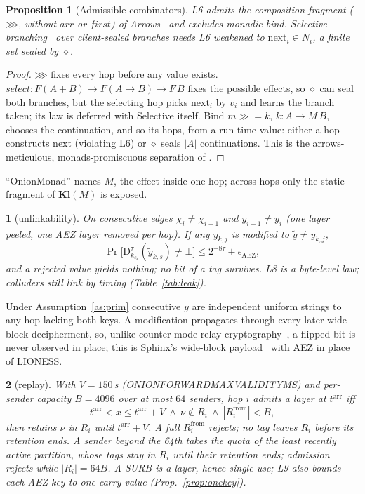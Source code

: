 \documentclass[journal]{IEEEtran}
\newtheorem{proposition}{Proposition}
\newcommand{\namedhead}{}
\newtheorem*{namedenv}{\namedhead}
\newenvironment{lawL}[2]{\renewcommand{\namedhead}{Law #1}%
  \begin{namedenv}[#2]}{\end{namedenv}}
\newcommand{\then}{\mathbin{\ggg}}
\newcommand{\Kl}{\mathbf{Kl}}
\newcommand{\cl}{\diamond}
\newcommand{\Dec}[2]{\mathrm{D}^{#1}_{#2}}
\newcommand{\nxt}{\mathrm{next}}
\newcommand{\frm}{\mathrm{from}}
\newcommand{\arr}{t^{\mathrm{arr}}}
\DeclareRobustCommand{\code}[1]{{\ttfamily\renewcommand{\_}{\textunderscore\allowbreak}#1}}
\begin{document}
\begin{proposition}[Admissible combinators]\label{prop:arrow}
L6 admits the composition fragment ($\then$, without $\mathit{arr}$ or
$\mathit{first}$) of Arrows~\cite{Hughes2000} and excludes monadic bind.
Selective branching~\cite{Mokhov2019} over client-sealed branches needs
L6 weakened to $\nxt_i\in N_i$, a finite set sealed by $\cl$.
\end{proposition}
\begin{proof}
$\then$ fixes every hop before any value exists.
$\mathit{select}:F(A+B)\to F(A\to B)\to F\,B$ fixes the possible effects,
so $\cl$ can seal both branches, but the selecting hop picks $\nxt_i$ by
$v_i$ and learns the branch taken; its law is deferred with Selective
itself.  Bind $m\gg\!\!=k$, $k:A\to M\,B$, chooses the
continuation, and so its hops, from a run-time value: either a hop
constructs $\nxt$ (violating L6) or $\cl$ seals $|A|$ continuations.  This
is the arrows-meticulous, monads-promiscuous separation of
\cite{Lindley2011}.
\end{proof}

``OnionMonad'' names $M$, the effect inside one hop; across hops only the
static fragment of $\Kl(M)$ is exposed.

\begin{lawL}{L8}{unlinkability}
On consecutive edges $\chi_i\ne\chi_{i+1}$ and $y_{i-1}\ne y_i$ (one layer
peeled, one AEZ layer removed per hop).  If any $y_{k,j}$ is modified to
$\tilde y\ne y_{k,j}$,
\[
\Pr\bigl[\Dec{\tau}{k_{c_k}}(\tilde y_{k,s})\ne\bot\bigr]\le2^{-8\tau}
+\epsilon_{\mathrm{AEZ}},
\]
and a rejected value yields nothing; no bit of a tag survives.  L8 is a
byte-level law; colluders still link by timing (Table~\ref{tab:leak}).
\end{lawL}

Under Assumption~\ref{as:prim} consecutive $y$ are independent uniform
strings to any hop lacking both keys.  A modification propagates through
every later wide-block decipherment, so, unlike counter-mode relay
cryptography~\cite{Degabriele2018}, a flipped bit is never observed in
place; this is Sphinx's wide-block payload~\cite{Danezis2009,Anderson1996}
with AEZ in place of LIONESS.

\begin{lawL}{L9}{replay}
With $V=150$\,s (\code{ONION\_FORWARD\_MAX\_VALIDITY\_MS}) and per-sender
capacity $B=4096$ over at most $64$ senders, hop $i$ admits a layer at
$\arr$ iff
\[
\arr<x\le\arr+V\ \wedge\ \nu\notin R_i\ \wedge\ |R_i^{\frm}|<B,
\]
then retains $\nu$ in $R_i$ until $\arr+V$.  A full $R_i^{\frm}$ rejects;
no tag leaves $R_i$ before its retention ends.  A sender beyond the 64th
takes the quota of the least recently active partition, whose tags stay in
$R_i$ until their retention ends; admission rejects while $|R_i|=64B$.  A SURB is a layer, hence
single use; L9 also bounds each AEZ key to one carry value
(Prop.~\ref{prop:onekey}).
\end{lawL}
\end{document}
